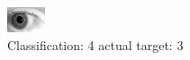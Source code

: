 \begin{figure}[h!]
\begin{center}
\includegraphics[width=0.60\columnwidth]{figures/ID332_class_4_target_3.png}
\end{center}
\caption{ Classification: 4 actual target: 3}
\label{fig:ID332_class_4_target_3}
\end{figure}
